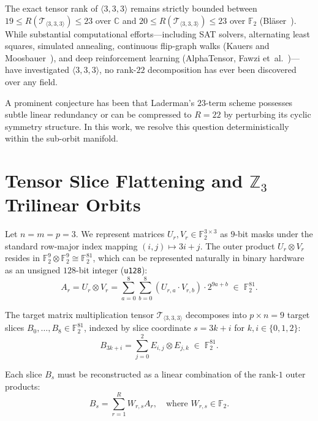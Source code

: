 \documentclass[11pt,reqno]{amsart}
\theoremstyle{plain}
\theoremstyle{definition}
\begin{document}
The exact tensor rank of $\langle 3, 3, 3 \rangle$ remains strictly bounded between $19 \le R(\mathcal{T}_{\langle 3, 3, 3 \rangle}) \le 23$ over $\mathbb{C}$ and $20 \le R(\mathcal{T}_{\langle 3, 3, 3 \rangle}) \le 23$ over $\mathbb{F}_2$ (Bl{\"a}ser~\cite{blaser2003}). While substantial computational efforts---including SAT solvers, alternating least squares, simulated annealing, continuous flip-graph walks (Kauers and Moosbauer~\cite{kauers2023}), and deep reinforcement learning (AlphaTensor, Fawzi et~al.~\cite{fawzi2022})---have investigated $\langle 3, 3, 3 \rangle$, no rank-$22$ decomposition has ever been discovered over any field.

A prominent conjecture has been that Laderman's $23$-term scheme possesses subtle linear redundancy or can be compressed to $R = 22$ by perturbing its cyclic symmetry structure. In this work, we resolve this question deterministically within the sub-orbit manifold.

\section{Tensor Slice Flattening and $\mathbb{Z}_3$ Trilinear Orbits}

Let $n = m = p = 3$. We represent matrices $U_r, V_r \in \mathbb{F}_2^{3 \times 3}$ as $9$-bit masks under the standard row-major index mapping $(i, j) \mapsto 3i + j$. The outer product $U_r \otimes V_r$ resides in $\mathbb{F}_2^9 \otimes \mathbb{F}_2^9 \cong \mathbb{F}_2^{81}$, which can be represented naturally in binary hardware as an unsigned $128$-bit integer (\texttt{u128}):
\begin{equation}
A_r = U_r \otimes V_r = \sum_{a=0}^8 \sum_{b=0}^8 (U_{r, a} \cdot V_{r, b}) \cdot 2^{9a + b} \;\in\; \mathbb{F}_2^{81}.
\end{equation}

The target matrix multiplication tensor $\mathcal{T}_{\langle 3, 3, 3 \rangle}$ decomposes into $p \times n = 9$ target slices $B_0, \dots, B_8 \in \mathbb{F}_2^{81}$, indexed by slice coordinate $s = 3k + i$ for $k, i \in \{0, 1, 2\}$:
\begin{equation}
B_{3k + i} = \sum_{j=0}^2 E_{i, j} \otimes E_{j, k} \;\in\; \mathbb{F}_2^{81}.
\end{equation}

Each slice $B_s$ must be reconstructed as a linear combination of the rank-$1$ outer products:
\begin{equation}
B_s = \sum_{r=1}^R W_{r, s} A_r, \quad \text{where } W_{r, s} \in \mathbb{F}_2.
\end{equation}
\end{document}
